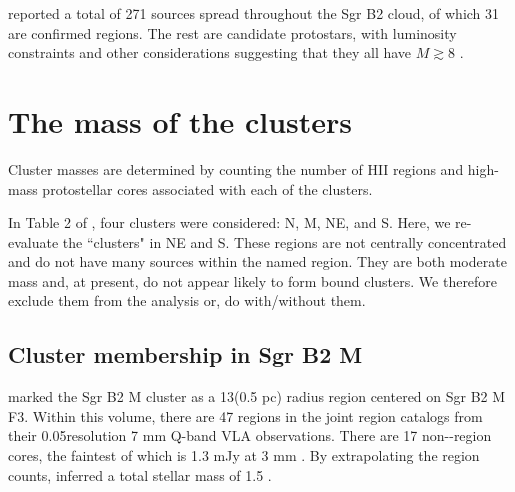 \documentclass[twocolumn]{aastex61}
\begin{document}
\citet{Ginsburg2018a} reported a total of 271 sources spread throughout the Sgr
B2 cloud, of which 31 are confirmed \hii regions.  The rest are candidate
protostars, with luminosity constraints and other considerations suggesting
that they all have $M\gtrsim8$ \msun.


\section{The mass of the clusters}
Cluster masses are determined by counting the number of HII regions and high-mass
protostellar cores associated with each of the clusters.

In Table 2 of \citet{Ginsburg2018a}, four clusters were considered: N, M, NE, and
S.  Here, we re-evaluate the ``clusters" in NE and S.  These regions are not
centrally concentrated and do not have many sources within the named region.
They are both moderate mass and, at present, do not appear likely to form bound
clusters.  We therefore exclude them from the analysis {\color{red} or, do with/without
them}.



\subsection{Cluster membership in Sgr B2 M}
\citet{Schmiedeke2016a} marked the Sgr B2 M cluster as a 13\arcsec  (0.5 pc) radius
region centered on Sgr B2 M F3.  Within this volume, there are 47 \hii regions
in the joint  \hii region catalogs \citep{Gaume1995a,De-Pree2015a} from their
0.05\arcsec resolution 7 mm Q-band
VLA observations.  There are 17 non-\hii-region cores, the faintest of which is
1.3 mJy at 3 mm \citep{Ginsburg2018a}.  By extrapolating the \hii region counts,
\citet{Ginsburg2018a} inferred a total stellar mass of 1.5 \msun.

% 
\end{document}

